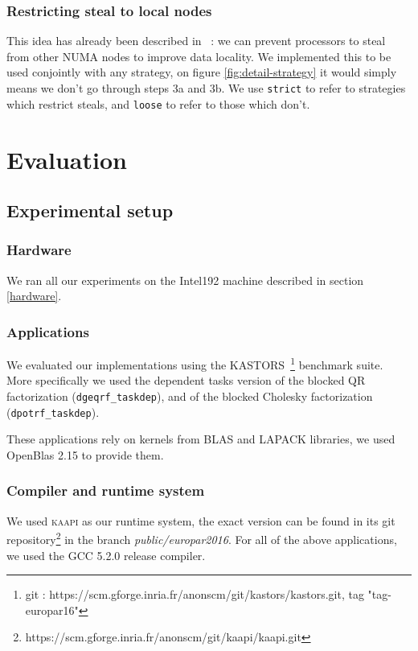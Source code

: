\documentclass{Styles/llncs}
\newcommand{\kaapi}{\textsc{\mbox{kaapi}}\xspace}
\begin{document}
\subsubsection{Restricting steal to local nodes}

This idea has already been described in~\cite{Olivier:2012:CMW:2388996.2389085} :
we can prevent processors to steal from other NUMA nodes to improve data locality.
We implemented this to be used conjointly with any strategy, on figure \ref{fig:detail-strategy}
it would simply means we don't go through steps 3a and 3b.
We use \verb/strict/ to refer to strategies which restrict steals, and \verb/loose/
to refer to those which don't.


\section{Evaluation}

\subsection{Experimental setup}

\subsubsection{Hardware}
We ran all our experiments on the Intel192 machine described in section \ref{hardware}.

\subsubsection{Applications}
We evaluated our implementations using the KASTORS~\cite{virouleau:hal-01081974}\footnote{git : https://scm.gforge.inria.fr/anonscm/git/kastors/kastors.git, tag "tag-europar16"} benchmark suite.
More specifically we used the dependent tasks version of the blocked QR factorization
(\verb/dgeqrf_taskdep/), and of the blocked Cholesky factorization (\verb/dpotrf_taskdep/).

These applications rely on kernels from BLAS and LAPACK libraries, we used OpenBlas 2.15
to provide them.

\subsubsection{Compiler and runtime system}

We used \kaapi as our runtime system, the exact version can be found in its
git repository\footnote{https://scm.gforge.inria.fr/anonscm/git/kaapi/kaapi.git } in the branch \emph{public/europar2016}.
For all of the above applications, we used the GCC 5.2.0 release compiler.
\end{document}
